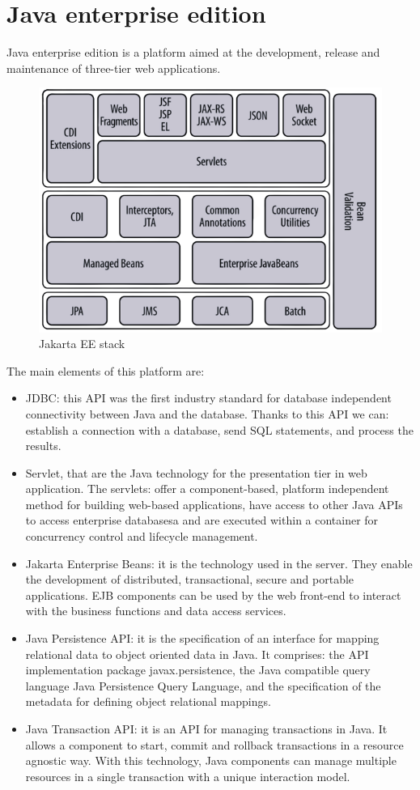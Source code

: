 \documentclass[12pt, a4paper]{report}
\begin{document}
    \section{Java enterprise edition}
    Java enterprise edition is a platform aimed at the development, release and maintenance of three-tier web applications.
    \begin{figure}[H]
        \centering
        \includegraphics[width=0.5\linewidth]{images/jee.png}
        \caption{Jakarta EE stack}
    \end{figure}
    The main elements of this platform are: 
    \begin{itemize}
        \item JDBC: this API was the first industry standard for database independent connectivity between Java and the database. Thanks to this API we can:
            establish a connection with a database, send SQL statements, and process the results. 
        \item Servlet, that are the Java technology for the presentation tier in web application. The servlets: 
            offer a component-based, platform independent method for building web-based applications, have access to other Java APIs to access enterprise databasesa 
            and are executed within a container for concurrency control and lifecycle management. 
        \item Jakarta Enterprise Beans: it is the technology used in the server. They enable the development of distributed, transactional, secure and portable applications. 
            EJB components can be used by the web front-end to interact with the business functions and data access services. 
        \item Java Persistence API: it is the specification of an interface for mapping relational data to object oriented data in Java. 
            It comprises: the API implementation package javax.persistence, the Java compatible query language Java Persistence Query Language, and the specification of the metadata for defining object
            relational mappings. 
        \item Java Transaction API: it is an API for managing transactions in Java. It allows a component to start, commit and rollback transactions in a resource agnostic way. 
            With this technology, Java components can manage multiple resources in a single transaction with a unique interaction model.
    \end{itemize}
\end{document}
